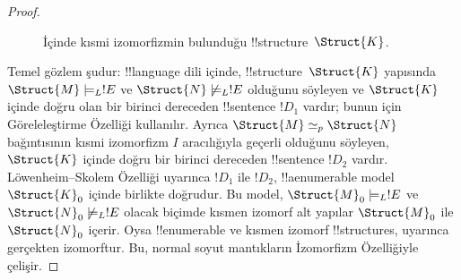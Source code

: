 \documentclass[../../../include/open-logic-section]{subfiles}
\begin{document}
\begin{proof}
\begin{figure}[h]
  \centering
  \caption{İçinde kısmi izomorfizmin bulunduğu !!{structure}~$\Struct{K}$.}
\end{figure}

Temel gözlem şudur: !!{language} dili içinde, !!{structure}~$\Struct{K}$
yapısında $\Struct{M}\models_L !E$ ve $\Struct{N}\not\models_L !E$
olduğunu söyleyen ve $\Struct{K}$ içinde doğru olan bir birinci dereceden
!!{sentence} $!D_1$ vardır; bunun için Göreleleştirme Özelliği kullanılır.
Ayrıca $\Struct{M}\simeq_p\Struct{N}$ bağıntısının kısmi izomorfizm $I$
aracılığıyla geçerli olduğunu söyleyen, $\Struct{K}$ içinde doğru bir
birinci dereceden !!{sentence} $!D_2$ vardır. L\"owenheim--Skolem Özelliği
uyarınca $!D_1$ ile $!D_2$, !!a{enumerable} model $\Struct{K}_0$ içinde
birlikte doğrudur. Bu model, $\Struct{M}_0\models_L !E$ ve
$\Struct{N}_0\not\models_L !E$ olacak biçimde kısmen izomorf alt yapılar
$\Struct{M}_0$ ile $\Struct{N}_0$ içerir. Oysa !!{enumerable} ve kısmen
izomorf !!{structure}s,  uyarınca gerçekten
izomorftur. Bu, normal soyut mantıkların İzomorfizm Özelliğiyle çelişir.
\end{proof}
\end{document}
